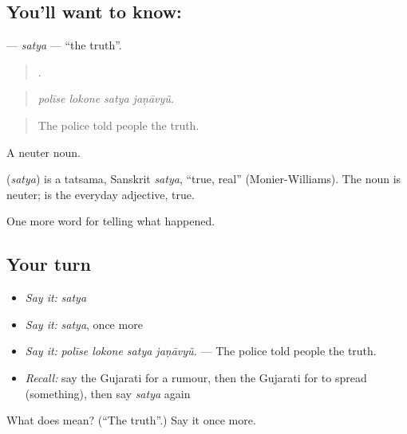 \subsection*{You'll want to know: }
\textbf{} — \emph{satya} — \textquotedblleft{}the truth\textquotedblright{}.

\begin{quote}
   .
\end{quote}

\begin{quote}
\emph{polīse lokone satya jaṇāvyũ.}
\end{quote}

\begin{quote}
The police told people the truth.
\end{quote}

A neuter noun.

\begin{cousinweb}
\textbf{} (\emph{satya}) is a tatsama, Sanskrit \emph{satya}, \textquotedblleft{}true, real\textquotedblright{} (Monier-Williams). The noun is neuter; \textbf{} is the everyday adjective, true.
\end{cousinweb}

\begin{grammarlens}[title={What you've built}]
One more word for telling what happened.
\end{grammarlens}

\subsection*{Your turn}
\begin{itemize}
\raggedright
  \item \emph{Say it:} \emph{satya}
  \item \emph{Say it:} \emph{satya}, once more
  \item \emph{Say it:} \emph{polīse lokone satya jaṇāvyũ.} — The police told people the truth.
  \item \emph{Recall:} say the Gujarati for a rumour, then the Gujarati for to spread (something), then say \emph{satya} again
\end{itemize}

\begin{tcolorbox}[breakable,colback=teal!4,colframe=teal!35!black,title={Before you move on}]
What does  mean? (\textquotedblleft{}The truth\textquotedblright{}.) Say it once more.
\end{tcolorbox}
